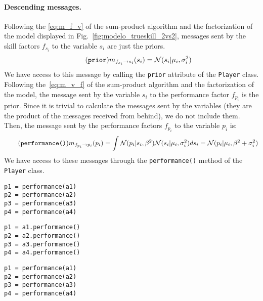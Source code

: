 \documentclass[article]{jss}
\newcommand{\N}{\mathcal{N}}
\begin{document}
\paragraph{Descending messages.}
%
Following the \ref{eq:m_f_v} of the sum-product algorithm and the factorization of the model displayed in Fig.~\ref{fig:modelo_trueskill_2vs2}, messages sent by the skill factors $f_{s_i}$ to the variable $s_i$ are just the priors. 
%
\begin{equation*}\label{eq:m_fs_s} \tag{\texttt{prior}}
 m_{f_{s_i} \rightarrow s_i}(s_i) = \N(s_i| \mu_i, \sigma_i^2)
\end{equation*}
%
We have access to this message by calling the \texttt{prior} attribute of the \texttt{Player} class. 
Following the~\ref{eq:m_v_f} of the sum-product algorithm and the factorization of the model, the message sent by the variable $s_i$ to the performance factor $f_{p_i}$ is the prior. 
Since it is trivial to calculate the messages sent by the variables (they are the product of the messages received from behind), we do not include them. 
Then, the message sent by the performance factors $f_{p_i}$ to the variable $p_i$ is: 
%
\begin{equation*}\label{eq:m_fp_p} \tag{\texttt{performance()}}
m_{f_{p_i} \rightarrow p_i}(p_i) = \int \N(p_i| s_i, \beta^2) \N(s_i| \mu_i, \sigma_i^2) ds_i = \N(p_i|\mu_i,\beta^2 + \sigma_i^2)
\end{equation*}
%
We have access to these messages through the \texttt{performance()} method of the \texttt{Player} class. 
%
\begin{paracol}{3}
\begin{lstlisting}[backgroundcolor=\color{julia!60},belowskip=0cm]
p1 = performance(a1)
p2 = performance(a2)
p3 = performance(a3)
p4 = performance(a4)
\end{lstlisting}
  \switchcolumn
\begin{lstlisting}[backgroundcolor=\color{python!60},belowskip=0cm]
p1 = a1.performance()
p2 = a2.performance()
p3 = a3.performance()
p4 = a4.performance()
\end{lstlisting}
   \switchcolumn
\begin{lstlisting}[backgroundcolor=\color{r!50},belowskip=0cm]
p1 = performance(a1)
p2 = performance(a2)
p3 = performance(a3)
p4 = performance(a4)
\end{lstlisting}  
\end{paracol}
\begin{lstlisting}[captionpos=b,backgroundcolor=\color{white},label=lst:performance, caption={Computing the individual prior performance.}, aboveskip=0cm, belowskip=0cm]
\end{lstlisting}
\end{document}

